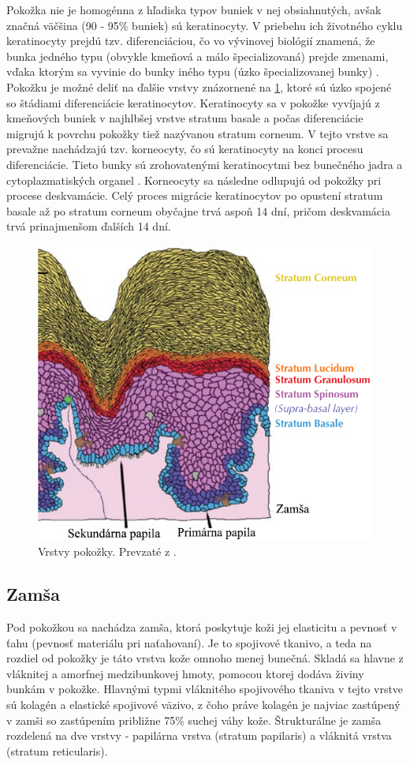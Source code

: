   Pokožka nie je homogénna z hľadiska typov buniek v nej obsiahnutých, avšak značná väčšina (90 - 95\% buniek) sú keratinocyty. V priebehu 
  ich životného cyklu keratinocyty prejdú tzv. diferenciáciou, čo vo vývinovej biológií znamená, že bunka jedného typu (obvykle kmeňová a  málo špecializovaná)
  prejde zmenami, vďaka ktorým sa vyvinie do bunky iného typu (úzko špecializovanej bunky) \cite{slack2012biology}. Pokožku je možné deliť na ďalšie
  vrstvy znázornené na \ref{obr:pokozka_vrstvy}, ktoré sú úzko spojené so štádiami diferenciácie keratinocytov. Keratinocyty sa v pokožke vyvíjajú
  z kmeňových buniek v najhlbšej vrstve stratum basale a počas diferenciácie migrujú k povrchu pokožky tiež nazývanou stratum corneum. V tejto vrstve sa 
  prevažne nachádzajú tzv. korneocyty, čo sú keratinocyty na konci procesu diferenciácie. Tieto bunky sú zrohovatenými keratinocytmi bez bunečného jadra
  a cytoplazmatiských organel \cite{koster2009epidermis}. Korneocyty sa následne odlupujú od pokožky pri procese deskvamácie. Celý proces migrácie
  keratinocytov po opustení stratum basale až po stratum corneum obyčajne trvá aspoň 14 dní, pričom deskvamácia trvá prinajmenšom ďalších 14 dní.

  \begin{figure}[h]
    \centering
    \includegraphics[width=0.6\linewidth]{obrazky-figures/pokozka_vrstvy.png} %
    \caption{Vrstvy pokožky. Prevzaté z \cite{FingerprintSrcBook}.}
    \label{obr:pokozka_vrstvy}
  \end{figure}

  \subsection{Zamša}
  Pod pokožkou sa nachádza zamša, ktorá poskytuje koži jej elasticitu a pevnosť v ťahu (pevnosť materiálu pri naťahovaní). Je to spojivové tkanivo,
  a teda na rozdiel od pokožky je táto vrstva kože omnoho menej bunečná. Skladá sa hlavne z vláknitej a amorfnej medzibunkovej hmoty, pomocou ktorej dodáva
  živiny bunkám v pokožke. Hlavnými typmi vláknitého spojivového tkaniva v tejto vrstve sú kolagén a elastické spojivové väzivo, z čoho práve kolagén je
  najviac zastúpený v zamši so zastúpením približne 75\% suchej váhy kože. Štrukturálne je zamša rozdelená na dve vrstvy - papilárna vrstva (stratum papilaris)
  a vláknitá vrstva (stratum reticularis).

